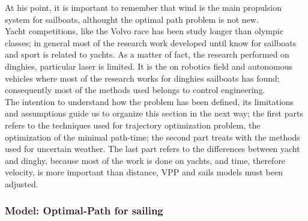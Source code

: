 At his point, it is important to remember that wind is the main propulsion system for sailboats, althought the optimal path problem is not  new.\\
Yacht competitions, like the Volvo race has been study longer than olympic classes; in general most of the research work developed until know for sailboats and sport is related to yachts. As a matter of fact, the research performed on dinghies, particular laser is limited. It is the on robotics field and autonomous vehicles where most of the research works for dinghies sailboats has found; consequently most of the methods used belongs to control engineering. %
\\
The intention to understand how the problem has been defined, its limitations and assumptions guide us to organize this section in the next way;  the first parts refers to the techniques used for trajectory optimization problem, the optimization of the minimal path-time; the second part treats with the methods used for uncertain weather. The last part refers to the differences between yacht and dinghy, because most of the work is done on yachts, and time, therefore velocity, is more important than distance, VPP and sails models must been adjusted.
\par %

\subsubsection{Model: Optimal-Path for sailing}


